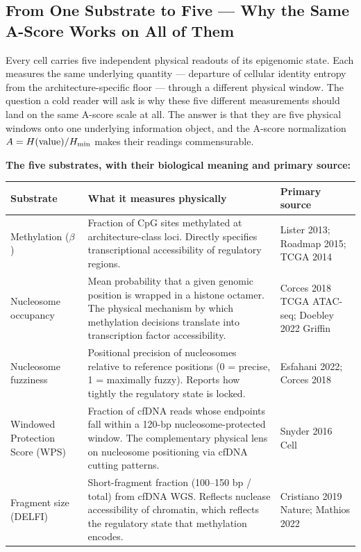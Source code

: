 \documentclass[12pt,a4paper]{article}
\begin{document}
\subsection{From One Substrate to Five --- Why the Same A-Score Works on All of Them}
\label{subsec:five_substrates}

Every cell carries five independent physical readouts of its epigenomic state.
Each measures the same underlying quantity --- departure of cellular identity
entropy from the architecture-specific floor --- through a different physical
window. The question a cold reader will ask is why these five different
measurements should land on the same A-score scale at all. The answer is that
they are five physical windows onto one underlying information object, and
the A-score normalization $A = H(\text{value})/H_{\rm min}$ makes their readings
commensurable.

\textbf{The five substrates, with their biological meaning and primary source:}

\begin{center}
\renewcommand{\arraystretch}{1.25}
\begin{tabular}{p{2.3cm}p{6.2cm}p{4.5cm}}
\toprule
\textbf{Substrate} & \textbf{What it measures physically} & \textbf{Primary source} \\
\midrule
Methylation ($\beta$) & Fraction of CpG sites methylated at architecture-class
loci. Directly specifies transcriptional accessibility of regulatory regions.
& Lister 2013; Roadmap 2015; TCGA 2014 \\
Nucleosome occupancy & Mean probability that a given genomic position is
wrapped in a histone octamer. The physical mechanism by which methylation
decisions translate into transcription factor accessibility.
& Corces 2018 TCGA ATAC-seq; Doebley 2022 Griffin \\
Nucleosome fuzziness & Positional precision of nucleosomes relative to
reference positions (0 = precise, 1 = maximally fuzzy). Reports how tightly
the regulatory state is locked. & Esfahani 2022; Corces 2018 \\
Windowed Protection Score (WPS) & Fraction of cfDNA reads whose endpoints fall
within a 120-bp nucleosome-protected window. The complementary physical lens
on nucleosome positioning via cfDNA cutting patterns.
& Snyder 2016 Cell \\
Fragment size (DELFI) & Short-fragment fraction (100--150 bp / total) from
cfDNA WGS. Reflects nuclease accessibility of chromatin, which reflects the
regulatory state that methylation encodes.
& Cristiano 2019 Nature; Mathios 2022 \\
\bottomrule
\end{tabular}
\end{center}
\end{document}
